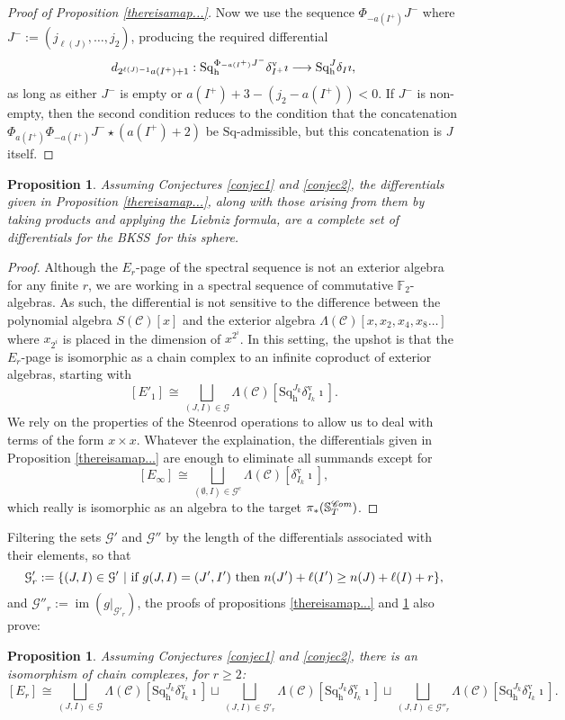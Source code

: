 \documentclass[11pt]{amsart} \renewcommand{\baselinestretch}{1.2}
\theoremstyle{plain}
\newtheorem{prop}[thm]{Proposition}
\numberwithin{equation}{section} %
\theoremstyle{plain}
\newtheorem{prop}[thm]{Proposition}
\numberwithin{equation}{chapter} %
\DeclareMathOperator{\im}{im}
\renewcommand{\to}{\longrightarrow}
\newcommand{\scrC}{\mathscr{C}}
\newcommand{\calg}{\mathcal{G}}
\newcommand{\CommOperad}{{\scrC}}
\newcommand{\Sq}{\mathrm{Sq}}
\newcommand{\F}{\mathbb{F}}
\newcommand{\algs}{{\scrC\!\textit{\normalfont\textit{om}}}}
\newcommand{\Ftwo}{\F_2}
\newcommand{\Eprime}[5]{[E'_{#2}#3]^{#4}_{#5}}
\newcommand{\E}[5]{[E^{#1}_{#2}#3]^{#4}_{#5}}
\newcommand{\uver}{^\mathrm{v}}
\newcommand{\dhor}{_\mathrm{h}}
\newcommand{\Sqh}{\mathrm{Sq}\dhor}
\newcommand{\deltav}{\delta\uver}
\newcommand{\BKSS}{BKSS}
\begin{document}
\begin{The Bousfield-Kan spectral sequence for a sphere}
\begin{proof}[Proof of Proposition \ref{thereisamap...}]
Now we use the sequence $\Phi_{-a(I^{+})}J^{-}$ where $J^-:=(j_{\ell(J)},\ldots,j_2)$, producing the required differential
\[d_{2^{\ell(J)-1}a(I^{+})+1}:\Sqh^{\Phi_{\smash{-a(I^{+})}}J^{-}}\deltav_{I^{+}}\imath\to \Sqh^J\delta_I\imath,\]
as long as either $J^{-}$ is empty or  $a(I^{+})+3-(j_2-a(I^{+}))< 0$. If $J^{-}$ is non-empty, then the second condition reduces to the condition that the concatenation $\Phi_{a(I^{+})}\Phi_{-a(I^{+})}J^{-}\star (a(I^{+})+2)$ be $\Sq$-admissible, but  this concatenation is $J$ itself.
\end{proof}
\begin{prop}
\label{thats all the difls}
Assuming Conjectures \ref{conjec1} and \ref{conjec2}, the differentials given in Proposition \ref{thereisamap...}, along with those arising from them by taking products and applying the Liebniz formula, are a complete set of differentials for the \BKSS\ for this sphere.
\end{prop}
\begin{proof}
Although the $E_r$-page of the spectral sequence is not an exterior algebra for any finite $r$, we are working in a spectral sequence of commutative $\Ftwo$-algebras. As such, the differential is not sensitive to the difference between the polynomial algebra 
$S(\CommOperad)[x]$ and the exterior algebra $\Lambda(\CommOperad)[x,x_2,x_4,x_8\ldots]$ where $x_{2^i}$ is placed in the dimension of $x^{2^i}$. In this setting, the upshot is that  the $E_r$-page is isomorphic as a chain complex to an infinite coproduct of exterior algebras, starting with
\[\Eprime{blank}{1}{}{}{}\cong\bigsqcup_{(J,I)\in\calg} \Lambda(\CommOperad)[\Sqh^{J_k}\deltav_{I_k}\imath].\]
We rely on the properties of the Steenrod operations to allow us to deal with terms of the form $x\times x$. Whatever the explaination, the differentials given in Proposition \ref{thereisamap...} are enough to eliminate all summands except for 
\[\E{}{\infty}{}{}{}\cong\bigsqcup_{(\emptyset,I)\in\calg^e} \Lambda(\CommOperad)[\deltav_{I_k}\imath],\]
which really is isomorphic as an algebra to the target $\pi_*(\mathbb{S}^{\algs}_T)$.
\end{proof}
Filtering the sets $\calg'$ and $\calg''$ by the length of the differentials associated with their elements, so that
\[\calg'_r:=\{(J,I)\in\calg'\ |\ \textup{if $g(J,I)=(J',I')$ then $n(J')+\ell(I')\geq n(J)+\ell(I)+r$} \},\]
and $\calg''_r:=\im(g|_{\calg'_r})$, the  proofs of propositions \ref{thereisamap...} and \ref{thats all the difls} also prove:
\begin{prop}
\label{the description of the interim pages of the sseq}
Assuming Conjectures \ref{conjec1} and \ref{conjec2}, there is an isomorphism of chain complexes, for $r\geq2$:
\[\E{}{r}{}{}{}\cong 
\bigsqcup_{(J,I)\in\calg} \Lambda(\CommOperad)[\Sqh^{J_k}\deltav_{I_k}\imath]\sqcup
\bigsqcup_{(J,I)\in\calg'_r} \Lambda(\CommOperad)[\Sqh^{J_k}\deltav_{I_k}\imath]\sqcup
\bigsqcup_{(J,I)\in\calg''_r} \Lambda(\CommOperad)[\Sqh^{J_k}\deltav_{I_k}\imath]
.\]
\end{prop}


\end{The Bousfield-Kan spectral sequence for a sphere}
\end{document}
